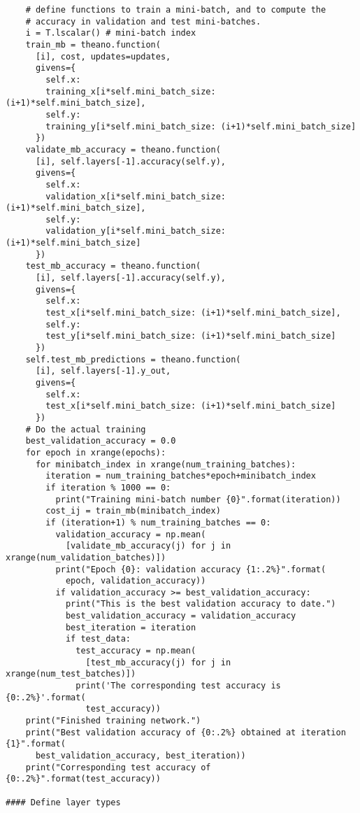 \documentclass[a4paper,twoside,10pt]{book}
\begin{document}
\begin{lstlisting}
    # define functions to train a mini-batch, and to compute the
    # accuracy in validation and test mini-batches.
    i = T.lscalar() # mini-batch index
    train_mb = theano.function(
      [i], cost, updates=updates,
      givens={
        self.x:
        training_x[i*self.mini_batch_size: (i+1)*self.mini_batch_size],
        self.y:
        training_y[i*self.mini_batch_size: (i+1)*self.mini_batch_size]
      })
    validate_mb_accuracy = theano.function(
      [i], self.layers[-1].accuracy(self.y),
      givens={
        self.x:
        validation_x[i*self.mini_batch_size: (i+1)*self.mini_batch_size],
        self.y:
        validation_y[i*self.mini_batch_size: (i+1)*self.mini_batch_size]
      })
    test_mb_accuracy = theano.function(
      [i], self.layers[-1].accuracy(self.y),
      givens={
        self.x:
        test_x[i*self.mini_batch_size: (i+1)*self.mini_batch_size],
        self.y:
        test_y[i*self.mini_batch_size: (i+1)*self.mini_batch_size]
      })
    self.test_mb_predictions = theano.function(
      [i], self.layers[-1].y_out,
      givens={
        self.x:
        test_x[i*self.mini_batch_size: (i+1)*self.mini_batch_size]
      })
    # Do the actual training
    best_validation_accuracy = 0.0
    for epoch in xrange(epochs):
      for minibatch_index in xrange(num_training_batches):
        iteration = num_training_batches*epoch+minibatch_index
        if iteration % 1000 == 0:
          print("Training mini-batch number {0}".format(iteration))
        cost_ij = train_mb(minibatch_index)
        if (iteration+1) % num_training_batches == 0:
          validation_accuracy = np.mean(
            [validate_mb_accuracy(j) for j in xrange(num_validation_batches)])
          print("Epoch {0}: validation accuracy {1:.2%}".format(
            epoch, validation_accuracy))
          if validation_accuracy >= best_validation_accuracy:
            print("This is the best validation accuracy to date.")
            best_validation_accuracy = validation_accuracy
            best_iteration = iteration
            if test_data:
              test_accuracy = np.mean(
                [test_mb_accuracy(j) for j in xrange(num_test_batches)])
              print('The corresponding test accuracy is {0:.2%}'.format(
                test_accuracy))
    print("Finished training network.")
    print("Best validation accuracy of {0:.2%} obtained at iteration {1}".format(
      best_validation_accuracy, best_iteration))
    print("Corresponding test accuracy of {0:.2%}".format(test_accuracy))

#### Define layer types


\end{lstlisting}
\end{document}
